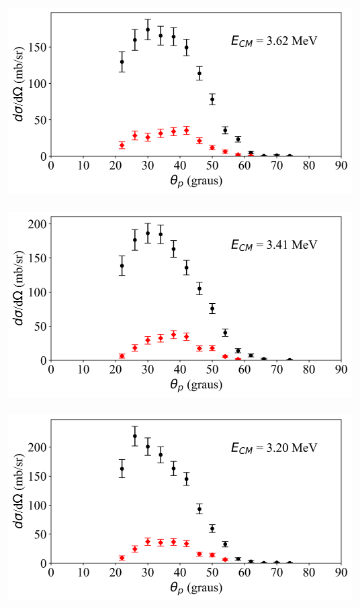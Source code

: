 \documentclass[a4paper,12pt,oneside]{book}
\begin{document}
\begin{figure}[H]
\centering
    \begin{subfigure}[b]{0.49\textwidth}
        \centering
        \includegraphics[scale=0.38, width=1.\columnwidth]{figs/dist_angs/dist_ang_12.png}
        \caption{}
        \label{subfig:dist_ang_m}
    \end{subfigure}%
    \hfill
    \begin{subfigure}[b]{0.48\textwidth}
        \centering
        \includegraphics[scale=0.38, width=1.\columnwidth]{figs/dist_angs/dist_ang_13.png}
        \caption{}
        \label{subfig:dist_ang_n}
    \end{subfigure}
    \begin{subfigure}[b]{0.49\textwidth}
        \centering
        \includegraphics[scale=0.38, width=1.\columnwidth]{figs/dist_angs/dist_ang_14.png}

\end{subfigure}
\end{figure}
\end{document}
